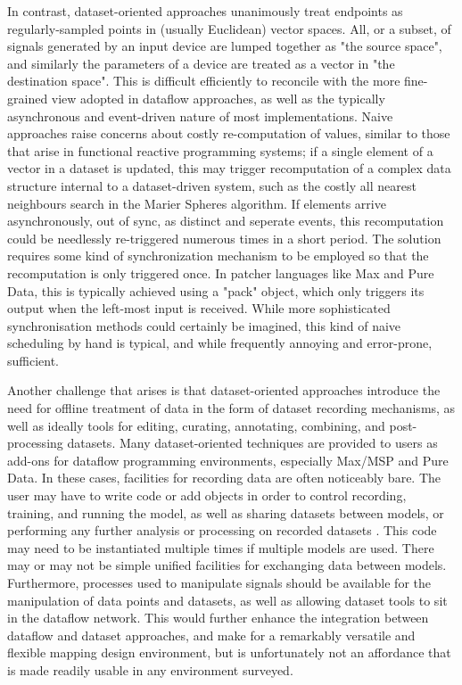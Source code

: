 \documentclass[main.tex]{subfiles}
\begin{document}
In contrast, dataset-oriented approaches unanimously treat endpoints as regularly-sampled
points in (usually Euclidean) vector spaces. All, or a subset, of signals generated by
an input device are lumped together as "the source space", and similarly the parameters
of a device are treated as a vector in "the destination space". This is difficult efficiently to
reconcile with the more fine-grained view adopted in dataflow approaches, as well
as the typically asynchronous and event-driven nature of most implementations.
Naive approaches raise concerns about costly re-computation of values, similar to those
that arise in functional reactive programming systems; if a single element of a vector
in a dataset is updated, this may trigger recomputation of a complex data structure
internal to a dataset-driven system, such as the costly all nearest neighbours search in
the Marier Spheres algorithm. If elements arrive asynchronously, out of sync, as distinct and seperate
events, this recomputation could be needlessly re-triggered numerous times in a short
period. The solution requires some kind of synchronization mechanism to be employed
so that the recomputation is only triggered once. In patcher languages like Max and Pure Data,
this is typically achieved using a "pack" object, which only triggers its output when the
left-most input is received. While more sophisticated synchronisation methods could
certainly be imagined, this kind of naive scheduling by hand is typical, and
while frequently annoying and error-prone, sufficient.

Another challenge that arises is that dataset-oriented approaches introduce the need for
offline treatment of data in the form of dataset recording mechanisms, as well as ideally
tools for editing, curating, annotating, combining, and post-processing datasets.
Many dataset-oriented techniques are provided to users as add-ons
for dataflow programming environments, especially Max/MSP and Pure Data.  In
these cases, facilities for recording data are often noticeably bare.  The user
may have to write code or add objects in order to control recording, training,
and running the model, as well as sharing datasets between models, or
performing any further analysis or processing on recorded datasets
\cite{bevilacqua2005nime_mnm, gillian2011sec, francoise2014nime_xmm, kiefer2014esn,
Bullock2015}.  This code may need to be instantiated multiple times if multiple
models are used.  There may or may not be simple unified facilities for
exchanging data between models.  Furthermore, processes used to manipulate
signals should be available for the
manipulation of data points and datasets, as well as allowing dataset tools
to sit in the dataflow network.  This would further
enhance the integration between dataflow and dataset approaches, and make for a
remarkably versatile and flexible mapping design environment, but is unfortunately
not an affordance that is made readily usable in any environment surveyed.
\end{document}
